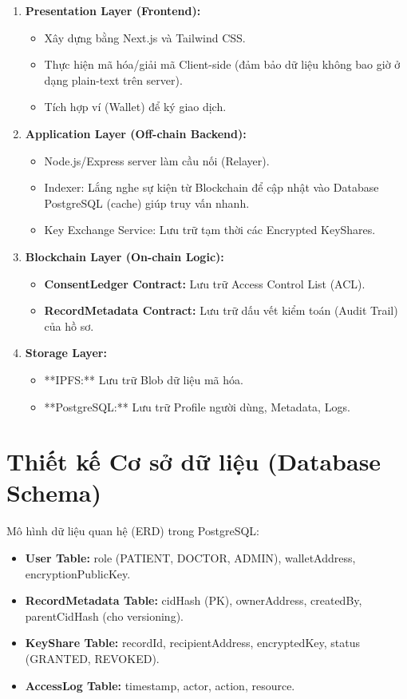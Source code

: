 \documentclass[12pt,a4paper]{report}
\begin{document}
\begin{enumerate}
    \item \textbf{Presentation Layer (Frontend):} 
    \begin{itemize}
        \item Xây dựng bằng Next.js và Tailwind CSS.
        \item Thực hiện mã hóa/giải mã Client-side (đảm bảo dữ liệu không bao giờ ở dạng plain-text trên server).
        \item Tích hợp ví (Wallet) để ký giao dịch.
    \end{itemize}
    \item \textbf{Application Layer (Off-chain Backend):}
    \begin{itemize}
        \item Node.js/Express server làm cầu nối (Relayer).
        \item Indexer: Lắng nghe sự kiện từ Blockchain để cập nhật vào Database PostgreSQL (cache) giúp truy vấn nhanh.
        \item Key Exchange Service: Lưu trữ tạm thời các Encrypted KeyShares.
    \end{itemize}
    \item \textbf{Blockchain Layer (On-chain Logic):}
    \begin{itemize}
        \item \textbf{ConsentLedger Contract:} Lưu trữ Access Control List (ACL).
        \item \textbf{RecordMetadata Contract:} Lưu trữ dấu vết kiểm toán (Audit Trail) của hồ sơ.
    \end{itemize}
    \item \textbf{Storage Layer:}
    \begin{itemize}
        \item **IPFS:** Lưu trữ Blob dữ liệu mã hóa.
        \item **PostgreSQL:** Lưu trữ Profile người dùng, Metadata, Logs.
    \end{itemize}
\end{enumerate}

\section{Thiết kế Cơ sở dữ liệu (Database Schema)}
Mô hình dữ liệu quan hệ (ERD) trong PostgreSQL:
\begin{itemize}
    \item \textbf{User Table:} role (PATIENT, DOCTOR, ADMIN), walletAddress, encryptionPublicKey.
    \item \textbf{RecordMetadata Table:} cidHash (PK), ownerAddress, createdBy, parentCidHash (cho versioning).
    \item \textbf{KeyShare Table:} recordId, recipientAddress, encryptedKey, status (GRANTED, REVOKED).
    \item \textbf{AccessLog Table:} timestamp, actor, action, resource.
\end{itemize}
\end{document}
